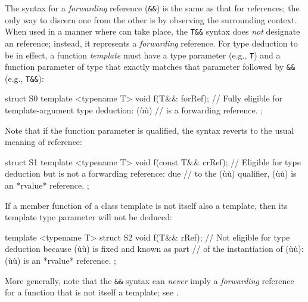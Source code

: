 The syntax for a \emph{forwarding} reference (\lstinline!&&!) is the same
as that for  references; the only way to discern one from
the other is by observing the surrounding context. When used in a manner
where  can take place, the \lstinline!T&&! syntax
does \emph{not} designate an  reference; instead, it
represents a \emph{forwarding} reference. For type deduction to be in
effect, a function \emph{template}
must have a type parameter (e.g., \lstinline!T!) and a function parameter of
type that exactly matches that parameter followed by \lstinline!&&!
(e.g., \lstinline!T&&!):

\begin{emcppslisting}
struct S0
{
    template <typename T>
    void f(T&& forRef);
        // Fully eligible for template-argument type deduction: (ù{}ù)
        // is a forwarding reference.
};
\end{emcppslisting}

\noindent Note that if the function parameter is qualified, the syntax reverts to
the usual meaning of  reference:

\begin{emcppslisting}
struct S1
{
    template <typename T>
    void f(const T&& crRef);
        // Eligible for type deduction but is not a forwarding reference: due
        // to the (ù{}ù) qualifier, (ù{}ù) is an *rvalue* reference.
};
\end{emcppslisting}

\noindent If a member function of a class template is not itself also a template,
then its template type parameter will not be deduced:

\begin{emcppslisting}
template <typename T>
struct S2
{
    void f(T&& rRef);
       // Not eligible for type deduction because (ù{}ù) is fixed and known as part
       // of the instantiation of (ù{}ù): (ù{}ù) is an *rvalue* reference.
};
\end{emcppslisting}

\noindent More generally, note that the \lstinline!&&! syntax can \emph{never}
imply a \emph{forwarding} reference for a function that is not itself a
template; see .


